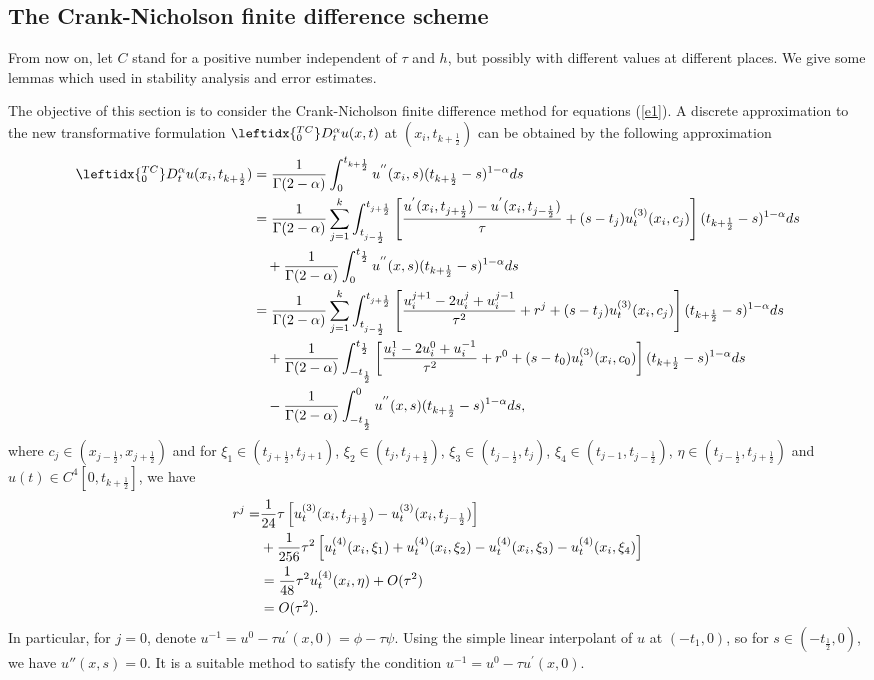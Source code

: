 \documentclass[3p,times]{elsarticle}
\begin{document}
\subsection{The Crank-Nicholson finite difference scheme}
From now on, let $C$ stand for a positive number independent of $\tau$ and $h$, but possibly with different values at different places. We give some lemmas which used in stability analysis and error estimates.

The objective of this section is to consider the Crank-Nicholson finite difference method for equations (\ref{e1}). A discrete approximation to the new transformative formulation $\leftidx{_0^{TC}}D_t^{\alpha}u(x,t)$ at $(x_i,t_{k+\frac{1}{2}})$ can be obtained by the following approximation
\begin{equation}\label{e6}
\aligned
\leftidx{_0^{TC}}D_t^{\alpha}u(x_i,t_{k+\frac{1}{2}})
&=\frac{1}{\Gamma(2-\alpha)}\int_0^{t_{k+\frac{1}{2}}}u^{''}(x_i,s)(t_{k+\frac{1}{2}}-s)^{1-\alpha}ds\\
&=\frac{1}{\Gamma(2-\alpha)}\sum\limits_{j=1}^k\int_{t_{j-\frac{1}{2}}}^{t_{j+\frac{1}{2}}}\left[\frac{u^{'}(x_i,t_{j+\frac{1}{2}})-u^{'}(x_i,t_{j-\frac{1}{2}})}{\tau}+(s-t_{j})u^{(3)}_{t}(x_i,c_j)\right](t_{k+\frac{1}{2}}-s)^{1-\alpha}ds\\
&\quad+\frac{1}{\Gamma(2-\alpha)}\int_{0}^{t_{\frac{1}{2}}}u^{''}(x,s)(t_{k+\frac{1}{2}}-s)^{1-\alpha}ds\\
&=\frac{1}{\Gamma(2-\alpha)}\sum\limits_{j=1}^k\int_{t_{j-\frac{1}{2}}}^{t_{j+\frac{1}{2}}}\left[\frac{u_i^{j+1}-2u_i^j+u_i^{j-1}}{\tau^2}+r^j+(s-t_{j})u^{(3)}_{t}(x_i,c_j)\right](t_{k+\frac{1}{2}}-s)^{1-\alpha}ds\\
&\quad+\frac{1}{\Gamma(2-\alpha)}\int_{-t_{\frac{1}{2}}}^{t_{\frac{1}{2}}}\left[\frac{u_i^{1}-2u_i^0+u_i^{-1}}{\tau^2}+r^0+(s-t_{0})u^{(3)}_{t}(x_i,c_0)\right](t_{k+\frac{1}{2}}-s)^{1-\alpha}ds\\
&\quad-\frac{1}{\Gamma(2-\alpha)}\int_{-t_{\frac{1}{2}}}^{0}u^{''}(x,s)(t_{k+\frac{1}{2}}-s)^{1-\alpha}ds,
\endaligned
\end{equation}
where $c_j\in(x_{j-\frac{1}{2}},x_{j+\frac{1}{2}})$ and for $\xi_1\in(t_{j+\frac{1}{2}},t_{j+1})$, $\xi_2\in(t_{j},t_{j+\frac{1}{2}})$, $\xi_3\in(t_{j-\frac{1}{2}},t_{j})$, $\xi_4\in(t_{j-1},t_{j-\frac{1}{2}})$, $\eta\in(t_{j-\frac{1}{2}},t_{j+\frac{1}{2}})$ and $u(t)\in C^4[0,t_{k+\frac{1}{2}}]$, we have
\begin{equation}\label{e7}
\aligned
r^j=&\frac{1}{24}\tau\left[u^{(3)}_{t}(x_i,t_{j+\frac{1}{2}})-u^{(3)}_{t}(x_i,t_{j-\frac{1}{2}})\right]\\
&+
\frac{1}{256}\tau^2\left[u^{(4)}_{t}(x_i,\xi_1)+u^{(4)}_{t}(x_i,\xi_2)-u^{(4)}_{t}(x_i,\xi_3)-u^{(4)}_{t}(x_i,\xi_4)\right]\\
&=\frac{1}{48}\tau^2u^{(4)}_{t}(x_i,\eta)+O(\tau^2)\\
&=O(\tau^2).
\endaligned
\end{equation}
In particular, for $j=0$, denote $u^{-1}=u^0-\tau u^{'}(x,0)=\phi-\tau\psi$. Using the simple linear interpolant of $u$ at $(-t_1,0)$, so for $s\in(-t_{\frac{1}{2}},0)$, we have $u''(x,s)=0$. It is a suitable method to satisfy the condition $u^{-1}=u^0-\tau u^{'}(x,0)$.
\end{document}
